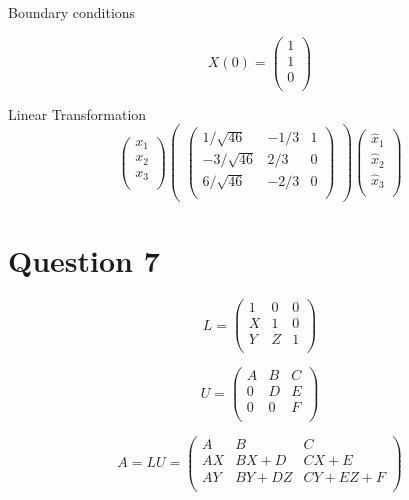 \documentclass[12pt, a4paper]{report}
\theoremstyle{plain}
\theoremstyle{definition}
\theoremstyle{remark}
\begin{document}
{{Boundary conditions

\[ X(0) = \left( \begin{array}{c}
    1 \\
    1 \\
    0 \\
  \end{array}
\right)\]

Linear Transformation
\[ \left(
  \begin{array}{c}
    x_1 \\
    x_2 \\
    x_3 \\
  \end{array}
\right)\left(
\begin{array}{ccc}
\left(\begin{array}{ccc}
1/ \sqrt{46} & -1/3 & 1 \\
-3/ \sqrt{46} & 2/3 & 0 \\
6/ \sqrt{46} & -2/3 & 0 \\
\end{array} \right)
 \end{array}
       \right)
        \left( \begin{array}{c}
    \hat{x}_1 \\
    \hat{x}_2 \\
    \hat{x}_3 \\
  \end{array}
\right)\]


}

\section*{Question 7}

\[ L = \left(\begin{array}{ccc}
1&0&0\\
X&1&0\\
Y&Z&1\\
\end{array}\right)\]

\[ U = \left( \begin{array}{ccc}
A&B&C\\
0&D&E\\
0&0&F\\
\end{array}\right)\]

\[ A = L U= \left(\begin{array}{ccc}
A&B&C\\
AX&BX+D&CX+E\\
AY&BY+DZ&CY+EZ+F\\
\end{array}\right)\]



}
\end{document}

